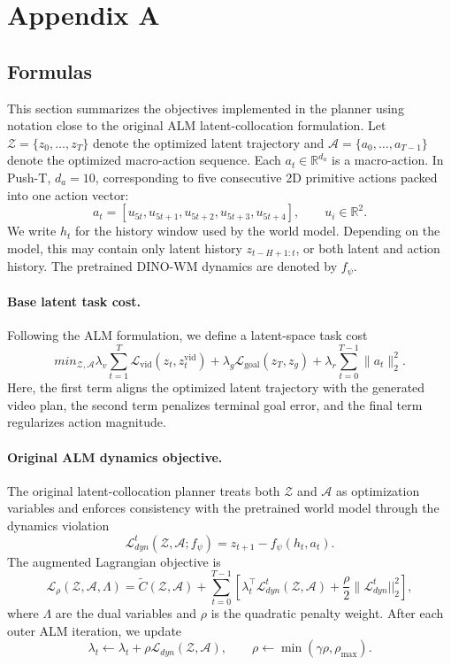 \section{Appendix A}
\subsection{Formulas}
This section summarizes the objectives implemented in the planner using notation close to the original ALM latent-collocation formulation. Let
\(\mathcal{Z}=\{z_0,\ldots,z_T\}\) denote the optimized latent trajectory and
\(\mathcal{A}=\{a_0,\ldots,a_{T-1}\}\) denote the optimized macro-action sequence. Each \(a_t\in\mathbb{R}^{d_a}\) is a macro-action. In Push-T, \(d_a=10\), corresponding to five consecutive 2D primitive actions packed into one action vector:
\[
a_t = [u_{5t},u_{5t+1},u_{5t+2},u_{5t+3},u_{5t+4}],
\qquad
u_i\in\mathbb{R}^2.
\]
We write \(h_t\) for the history window used by the world model. Depending on the model, this may contain only latent history \(z_{t-H+1:t}\), or both latent and action history. The pretrained DINO-WM dynamics are denoted by \(f_\psi\).

\paragraph{Base latent task cost.}
Following the ALM formulation, we define a latent-space task cost
\[
min_{\mathcal{Z},\mathcal{A}}
\lambda_v
\sum_{t=1}^{T}
\mathcal{L}_{\mathrm{vid}}(z_t,z_t^{\mathrm{vid}})
+
\lambda_g
\mathcal{L}_{\mathrm{goal}}(z_T,z_g)
+
\lambda_r
\sum_{t=0}^{T-1}
\|a_t\|_2^2 .
\]
Here, the first term aligns the optimized latent trajectory with the generated video plan, the second term penalizes terminal goal error, and the final term regularizes action magnitude.

\paragraph{Original ALM dynamics objective.}
The original latent-collocation planner treats both \(\mathcal{Z}\) and \(\mathcal{A}\) as optimization variables and enforces consistency with the pretrained world model through the dynamics violation
\[
\mathcal{L}^t_{dyn}(\mathcal{Z},\mathcal{A};f_\psi )
=
z_{t+1}-f_\psi(h_t,a_t).
\]
The augmented Lagrangian objective is
\[
\mathcal{L}_{\rho}(\mathcal{Z},\mathcal{A},\Lambda)
=
\tilde C(\mathcal{Z},\mathcal{A})
+
\sum_{t=0}^{T-1}
\left[
\lambda_t^\top \mathcal{L}^t_{dyn}(\mathcal{Z},\mathcal{A})
+
\frac{\rho}{2}
\|\mathcal{L}^t_{dyn}||_2^2
\right],
\]
where \(\Lambda\) are the dual variables and \(\rho\) is the quadratic penalty weight. After each outer ALM iteration, we update
\[
\lambda_t \leftarrow \lambda_t+\rho \mathcal{L}_{dyn}(\mathcal{Z},\mathcal{A}),
\qquad
\rho \leftarrow \min(\gamma\rho,\rho_{\max}).
\]

